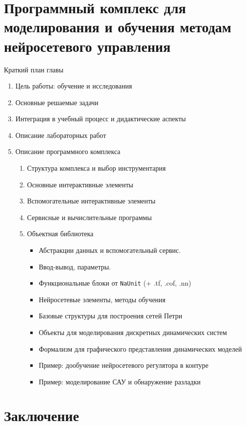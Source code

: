 \documentclass[12pt]{rusthesis}
\begin{document}
\chapter{Программный комплекс для моделирования и обучения методам нейросетевого управления}
\centerline{Краткий план главы}
\begin{enumerate}
\item Цель работы: обучение и исследования
\item Основные решаемые задачи
\item Интеграция в учебный процесс и дидактические аспекты
\item Описание лабораторных работ
\item Описание программного комплекса
  \begin{enumerate}
  \item Структура комплекса и выбор инструментария
  \item Основные интерактивные элементы
  \item Вспомогательные интерактивные элементы
  \item Сервисные и вычислительные программы
  \item Объектная библиотека
    \begin{itemize}
    \item Абстракции данных и вспомогательный сервис.
    \item Ввод-вывод, параметры.
    \item Функциональные блоки от {\tt NaUnit} (+ .tf, .cof, .nn)
    \item Нейросетевые элементы, методы обучения
    \item Базовые структуры для построения сетей Петри
    \item Объекты для моделирования дискретных динамических систем
    \item Формализм для графического представления динамических моделей
    \item Пример: дообучение нейросетевого регулятора в контуре
    \item Пример: моделирование САУ и обнаружение разладки
    \end{itemize}
  \end{enumerate}
\end{enumerate}



\chapter*{Заключение}
\end{document}

